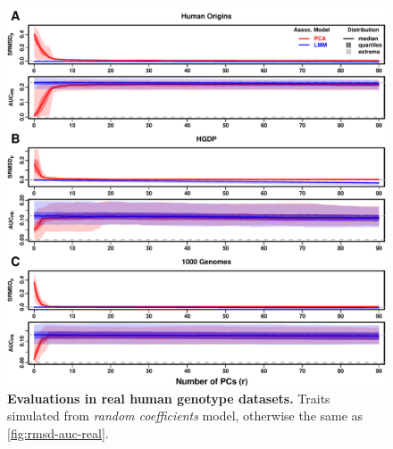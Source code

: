 \documentclass[11pt]{article}
\begin{document}
\begin{figure}[bp!]
  \centering
  \includegraphics[width=\textwidth,height=\textheight,keepaspectratio]{rmsd-auc-real.pdf}
  \caption{
    {\small 
      {\bf Evaluations in real human genotype datasets.}
      Traits simulated from \textit{random coefficients} model, otherwise the same as \cref{fig:rmsd-auc-real}.
    }
  }
  \label{fig:rmsd-auc-real-rc}
\end{figure}
\end{document}
